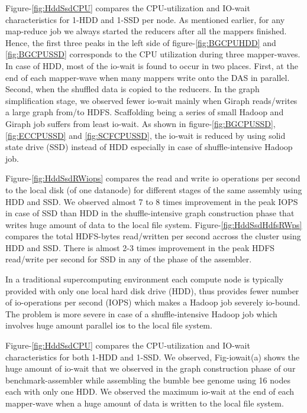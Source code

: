 \documentclass[conference]{IEEEtran}
\begin{document}
Figure-\ref{fig:HddSsdCPU} compares the CPU-utilization and IO-wait characteristics for 1-HDD and 1-SSD per node.
As mentioned earlier, for any map-reduce job we always started the reducers after all the mappers finished. 
Hence, the first three peaks in the left side of figure-\ref{fig:BGCPUHDD} and \ref{fig:BGCPUSSD} corresponds to the CPU utilization during three mapper-waves. 
In case of HDD, most of the io-wait is found to occur in two places. First, at the end of each mapper-wave when many mappers write onto the DAS in parallel. Second, when the shuffled data is copied to the reducers.
In the graph simplification stage, we observed fewer io-wait mainly when Giraph reads/writes a large graph from/to HDFS.
Scaffolding being a series of small Hadoop and Giraph job suffers from least io-wait. 
As shown in figure-\ref{fig:BGCPUSSD}, \ref{fig:ECCPUSSD} and \ref{fig:SCFCPUSSD}, the io-wait is reduced by using solid state drive (SSD) instead of HDD especially in case of shuffle-intensive Hadoop job. 

Figure-\ref{fig:HddSsdRWiops} compares the read and write io operations per second to the local disk (of one datanode) for different stages of the same assembly using HDD and SSD.
We observed almost 7 to 8 times improvement in the peak IOPS in case of SSD than HDD in the shuffle-intensive graph construction phase that writes huge amount of data to the local file system.
Figure-\ref{fig:HddSsdHdfsRWps} compares the total HDFS-bytes read/written per second accross the cluster using HDD and SSD. 
There is almost 2-3 times improvement in the peak HDFS read/write per second for SSD in any of the phase of the assembler.

In a traditional supercomputing environment each compute node is typically provided with only one local hard disk drive (HDD), thus provides fewer number of io-operations per second (IOPS) which makes a Hadoop job severely io-bound.
The problem is more severe in case of a shuffle-intensive Hadoop job which involves huge amount parallel ios to the local file system.

Figure-\ref{fig:HddSsdCPU} compares the CPU-utilization and IO-wait characteristics for both 1-HDD and 1-SSD.
We observed, Fig-iowait(a) shows the huge amount of io-wait that we observed in the graph construction phase of our benchmark-assembler while assembling the bumble bee genome using 16 nodes each with only one HDD.
We observed the maximum io-wait at the end of each mapper-wave when a huge amount of data is written to the local file system. 
\end{document}
